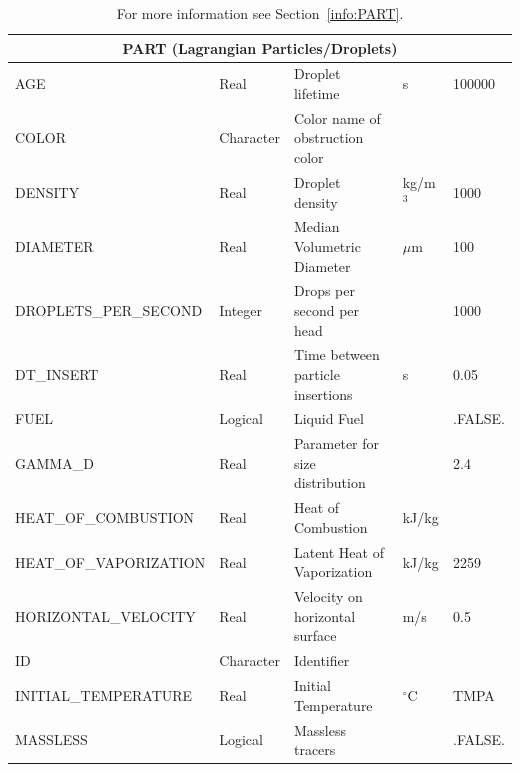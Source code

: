\documentclass[11pt]{book}
\begin{document}
\begin{table}[H]
\caption{For more information see Section~\ref{info:PART}.}\label{tbl:PART}
\noindent
\begin{tabular*}{\textwidth}{@{\extracolsep{\fill}}|l|l|l|l|l|}
\hline
\multicolumn{5}{|c|}{{\ct PART} (Lagrangian Particles/Droplets)} \\ \hline \hline
{\ct AGE}                       & Real            & Droplet lifetime                  & s         & 100000        \\ \hline
{\ct COLOR}                     & Character       & Color name of obstruction color   &           &               \\ \hline
{\ct DENSITY}                   & Real            & Droplet density                   & kg/m$^3$  & 1000          \\ \hline
{\ct DIAMETER}                  & Real            & Median Volumetric Diameter        & $\mu$m    & 100           \\ \hline
{\ct DROPLETS\_PER\_SECOND}     & Integer         & Drops per second per head         &           & 1000          \\ \hline
{\ct DT\_INSERT}                & Real            & Time between particle insertions  & s         & 0.05          \\ \hline
{\ct FUEL}                      & Logical         & Liquid Fuel                       &           & {\ct .FALSE.} \\ \hline
{\ct GAMMA\_D}                  & Real            & Parameter for size distribution   &           & 2.4           \\ \hline
{\ct HEAT\_OF\_COMBUSTION}      & Real            & Heat of Combustion                & kJ/kg     &               \\ \hline
{\ct HEAT\_OF\_VAPORIZATION}    & Real            & Latent Heat of Vaporization       & kJ/kg     & 2259          \\ \hline
{\ct HORIZONTAL\_VELOCITY}      & Real            & Velocity on horizontal surface    & m/s       &  0.5          \\ \hline
{\ct ID}                        & Character       & Identifier                        &           &               \\ \hline
{\ct INITIAL\_TEMPERATURE}      & Real            & Initial Temperature               & $^\circ$C & {\ct TMPA}    \\ \hline
{\ct MASSLESS}                  & Logical         & Massless tracers                  &           & {\ct .FALSE.} \\ \hline

\end{tabular*}
\end{table}
\end{document}
